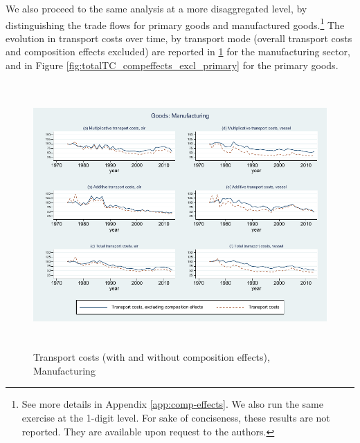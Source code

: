 \documentclass[a4paper,11pt]{article}
\begin{document}
We also proceed to the same analysis at a more disaggregated level, by distinguishing the trade flows for primary goods and manufactured goods.\footnote{See more details in Appendix \ref{app:comp-effects}. We also run the same exercise at the 1-digit level. For sake of conciseness, these results are not reported. They are available upon request to the authors.} The evolution in transport costs over time, by transport mode (overall transport costs and composition effects excluded) are reported in \ref{fig:totalTC_compeffects_excl_manuf} for the manufacturing sector, and in Figure \ref{fig:totalTC_compeffects_excl_primary} for the primary goods.

\begin{figure}[htbp]
\caption{Transport costs (with and without composition effects), Manufacturing}
\label{fig:totalTC_compeffects_excl_manuf}
\begin{center}
\includegraphics[height=4in]
{graph_composition_manuf.pdf}
\end{center}
\end{figure}
\end{document}
